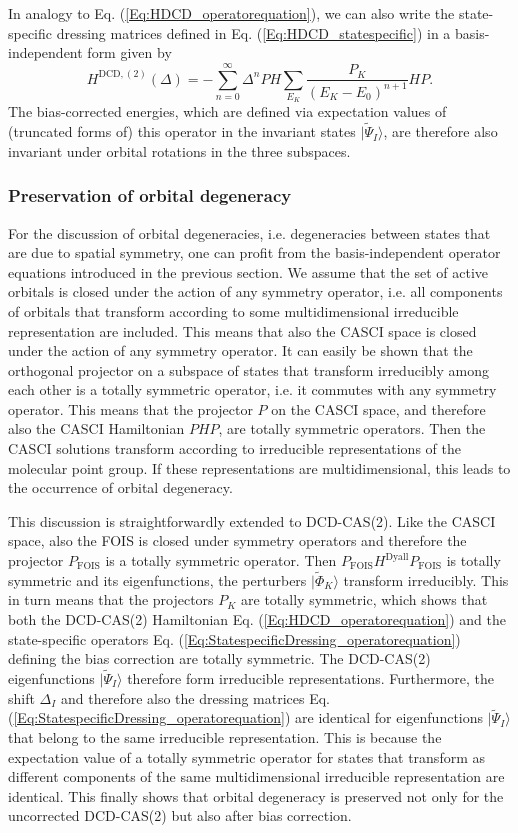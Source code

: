 In analogy to Eq. (\ref{Eq:HDCD_operatorequation}), we can also write the state-specific dressing matrices defined in Eq. (\ref{Eq:HDCD_statespecific}) in a basis-independent form given by
\begin{equation}
\label{Eq:StatespecificDressing_operatorequation}
H^{\text{DCD},(2)}(\Delta) = - \sum_{n=0}^\infty \Delta^n PH \sum_{E_K} \frac{P_K}{(E_K-E_0)^{n+1}}HP.
\end{equation}
The bias-corrected energies, which are defined via expectation values of (truncated forms of) this operator in the invariant states $|\tilde{\Psi}_I\rangle$, are therefore also invariant under orbital rotations in the three subspaces.

\subsubsection{Preservation of orbital degeneracy}
For the discussion of orbital degeneracies, i.e. degeneracies between states that are due to spatial symmetry, one can profit from the basis-independent operator equations introduced in the previous section.
We assume that the set of active orbitals is closed under the action of any symmetry operator, i.e. all components of orbitals that transform according to some multidimensional irreducible representation are included. This means that also the CASCI space is closed under the action of any symmetry operator. It can easily be shown that the orthogonal projector on a subspace of states that transform irreducibly among each other is a totally symmetric operator, i.e. it commutes with any symmetry operator. This means that the projector $P$ on the CASCI space, and therefore also the CASCI Hamiltonian $PHP$, are totally symmetric operators.
Then the CASCI solutions transform according to irreducible representations of the molecular point group. If these representations are multidimensional, this leads to the occurrence of orbital degeneracy.

This discussion is straightforwardly extended to DCD-CAS(2). Like the CASCI space, also the FOIS is closed under symmetry operators and therefore the projector $P_\text{FOIS}$ is a totally symmetric operator. Then $P_\text{FOIS}H^\text{Dyall}P_\text{FOIS}$ is totally symmetric and its eigenfunctions, the perturbers $|\tilde{\Phi}_K\rangle$ transform irreducibly. This in turn means that the projectors $P_K$ are totally symmetric, which shows that both the DCD-CAS(2) Hamiltonian Eq. (\ref{Eq:HDCD_operatorequation}) and the state-specific operators Eq. (\ref{Eq:StatespecificDressing_operatorequation}) defining the bias correction are totally symmetric. The DCD-CAS(2) eigenfunctions $|\tilde{\Psi}_I\rangle$ therefore form irreducible representations. Furthermore, the shift $\Delta_I$ and therefore also the dressing matrices Eq. (\ref{Eq:StatespecificDressing_operatorequation}) are identical for eigenfunctions $|\tilde{\Psi}_I\rangle$ that belong to the same irreducible representation. This is because the expectation value of a totally symmetric operator for states that transform as different components of the same multidimensional irreducible representation are identical. This finally shows that orbital degeneracy is preserved not only for the uncorrected DCD-CAS(2) but also after bias correction.


